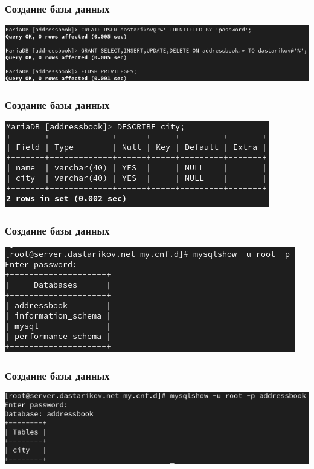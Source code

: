 \begin{frame}
\frametitle{Создание базы данных}
    \centering
    \includegraphics[width=\textwidth]{../images/image13.png}
\end{frame}

\begin{frame}
\frametitle{Создание базы данных}
    \centering
    \includegraphics[width=\textwidth]{../images/image14.png}
\end{frame}

\begin{frame}
\frametitle{Создание базы данных}
    \centering
    \includegraphics[width=\textwidth]{../images/image15.png}
\end{frame}

\begin{frame}
\frametitle{Создание базы данных}
    \centering
    \includegraphics[width=\textwidth]{../images/image16.png}
\end{frame}

